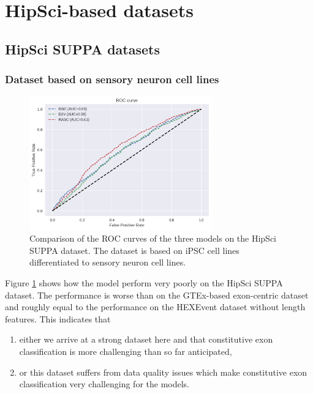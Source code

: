

\section{HipSci-based datasets} \label{sec:hipsci} 

\subsection{HipSci SUPPA datasets} \label{subsec:hipsci_suppa}
\subsubsection{Dataset based on sensory neuron cell lines}

\begin{figure}
	\centering\includegraphics[width=0.7\textwidth]{../visualizations/ch5-results/suppa_cross_model_roc_auc_comparison.png} 
	\caption{Comparison of the ROC curves of the three models on the HipSci SUPPA dataset. The dataset is based on iPSC cell lines differentiated to sensory neuron cell lines. }
	\label{fig:suppa_auc_roc}
\end{figure}

Figure \ref{fig:suppa_auc_roc} shows how the model perform very poorly on the HipSci SUPPA dataset. The performance is worse than on the GTEx-based exon-centric dataset and roughly equal to the performance on the HEXEvent dataset without length features. This indicates that 
\begin{enumerate}
	\item either we arrive at a strong dataset here and that constitutive exon classification is more challenging than so far anticipated,
	\item or this dataset suffers from data quality issues which make constitutive exon classification very challenging for the models.
\end{enumerate}

